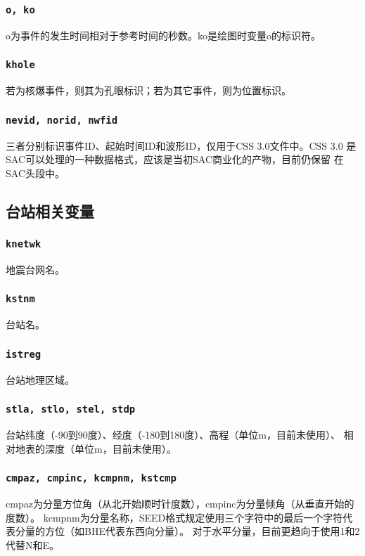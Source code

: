 \subsubsection{\texttt{o, ko}}
o为事件的发生时间相对于参考时间的秒数。ko是绘图时变量o的标识符。

\subsubsection{\texttt{khole}}
若为核爆事件，则其为孔眼标识；若为其它事件，则为位置标识。

\subsubsection{\texttt{nevid, norid, nwfid}}
三者分别标识事件ID、起始时间ID和波形ID，仅用于CSS 3.0文件中。CSS 3.0
是SAC可以处理的一种数据格式，应该是当初SAC商业化的产物，目前仍保留
在SAC头段中。

\subsection{台站相关变量}

\subsubsection{\texttt{knetwk}}
地震台网名。

\subsubsection{\texttt{kstnm}}
台站名。

\subsubsection{\texttt{istreg}\dag}
台站地理区域。

\subsubsection{\texttt{stla, stlo, stel, stdp}}
台站纬度（-90到90度）、经度（-180到180度）、高程（单位m，目前未使用）、
相对地表的深度（单位m，目前未使用）。

\subsubsection{\texttt{cmpaz, cmpinc, kcmpnm, kstcmp}}
cmpaz为分量方位角（从北开始顺时针度数），cmpinc为分量倾角（从垂直开始的度数）。
kcmpnm为分量名称，SEED格式规定使用三个字符中的最后一个字符代表分量的方位（如BHE代表东西向分量）。
对于水平分量，目前更趋向于使用1和2代替N和E。


